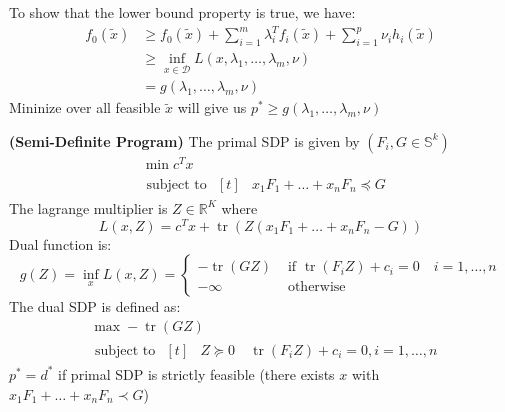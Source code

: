 \begin{remark}
    To show that the lower bound property is true, we have:
    \begin{equation*}
    \begin{aligned}
        f_0(\tilde{x}) &\ge f_0(\tilde{x}) + \sum^m_{i=1}\lambda_i^Tf_i(\tilde{x}) + \sum^p_{i=1} \nu_ih_i(\tilde{x}) \\
        &\ge \inf_{x\in\mathcal{D}} L(x, \lambda_1,\dots,\lambda_m, \nu) \\
        &=g(\lambda_1,\dots,\lambda_m,\nu)
    \end{aligned}
    \end{equation*}
    Mininize over all feasible $\tilde{x}$ will give us $p^*\ge g(\lambda_1,\dots,\lambda_m,\nu)$
\end{remark}


\begin{definition}{\textbf{(Semi-Definite Program)}}
    The primal SDP is given by $(F_i, G\in\mathbb{S}^k)$
    \begin{equation*}
    \begin{aligned}
        &\min c^Tx \\
        &\text{ subject to } \begin{aligned}[t]
            &x_1F_1 + \dots + x_nF_n \preceq G
        \end{aligned}
    \end{aligned}        
    \end{equation*}
    The lagrange multiplier is $Z\in \mathbb{R}^{K}$ where 
    \begin{equation*}
        L(x, Z) = c^Tx + \operatorname{tr}(Z(x_1F_1 + \dots + x_nF_n - G))
    \end{equation*}
    Dual function is:
    \begin{equation*}
        g(Z) = \inf_x L(x, Z) = \begin{cases}
            -\operatorname{tr}(GZ) &\text{ if } \operatorname{tr}(F_iZ) + c_i= 0 \quad i=1,\dots,n \\
            -\infty &\text{ otherwise }
        \end{cases}
    \end{equation*}
    The dual SDP is defined as:
    \begin{equation*}
    \begin{aligned}
        &\max -\operatorname{tr}(GZ) \\
        &\text{ subject to } \begin{aligned}[t]
            &Z\succeq 0 \quad \operatorname{tr}(F_iZ)+c_i=0, i=1,\dots,n 
        \end{aligned}
    \end{aligned}            
    \end{equation*}
    $p^* = d^*$ if primal SDP is strictly feasible (there exists $x$ with $x_1F_1 + \dots + x_nF_n\prec G$)
\end{definition}

